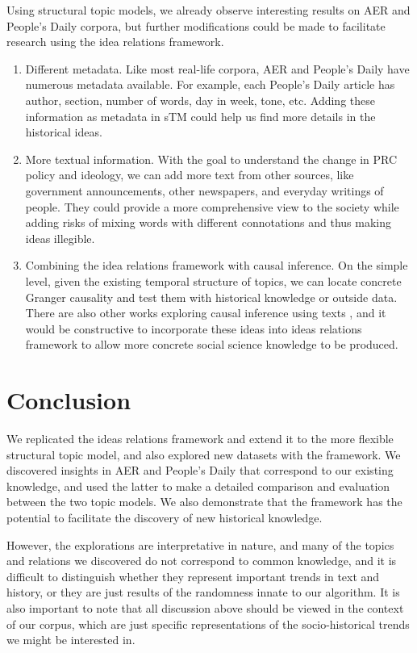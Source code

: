 \documentclass{article}
\begin{document}
Using structural topic models, we already observe interesting results on AER and People's Daily corpora, but further modifications could be made to facilitate research using the idea relations framework. 

\begin{enumerate}
  \item Different metadata. Like most real-life corpora, AER and People's Daily have numerous metadata available. For example, each People's Daily article has author, section, number of words, day in week, tone, etc. Adding these information as metadata in sTM could help us find more details in the historical ideas. 
  \item More textual information. With the goal to understand the change in PRC policy and ideology, we can add more text from other sources, like government announcements, other newspapers, and everyday writings of people. They could provide a more comprehensive view to the society while adding risks of mixing words with different connotations and thus making ideas illegible. 
  \item Combining the idea relations framework with causal inference. On the simple level, given the existing temporal structure of topics, we can locate concrete Granger causality and test them with historical knowledge or outside data. There are also other works exploring causal inference using texts \cite{causal1}, and it would be constructive to incorporate these ideas into ideas relations framework to allow more concrete social science knowledge to be produced.

\end{enumerate}





\section{Conclusion}

We replicated the ideas relations framework and extend it to the more flexible structural topic model, and also explored new datasets with the framework. We discovered insights in AER and People's Daily that correspond to our existing knowledge, and used the latter to make a detailed comparison and evaluation between the two topic models. We also demonstrate that the framework has the potential to facilitate the discovery of new historical knowledge. 

However, the explorations are interpretative in nature, and many of the topics and relations we discovered do not correspond to common knowledge, and it is difficult to distinguish whether they represent important trends in text and history, or they are just results of the randomness innate to our algorithm. It is also important to note that all discussion above should be viewed in the context of our corpus, which are just specific representations of the socio-historical trends we might be interested in.
\end{document}
